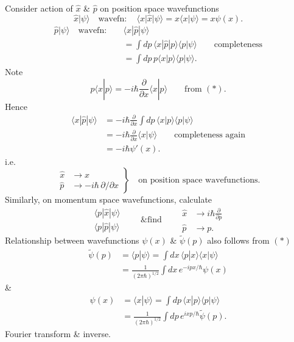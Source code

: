 \documentclass[11pt,a4paper]{article}
\begin{document}
Consider action of $\hat{x}$ \& $\hat{p}$ on position space wavefunctions
\[
    \hat{x}|\psi\rangle\quad\text{wavefn}:\quad
    \langle x|\hat{x}|\psi\rangle=x\langle x|\psi\rangle=x\psi(x).
\]
\begin{align*}
    \hat{p}|\psi\rangle\quad\text{wavefn}:\quad
    &\langle x|\hat{p}|\psi\rangle\\
    &=\int dp\,\langle x|\hat{p}|p\rangle\langle p|\psi\rangle
    \qquad\text{completeness}\\
    &=\int dp\,p\langle x|p\rangle\langle p|\psi\rangle.
\end{align*}
Note
\[
    p\langle x|p\rangle=-i\hbar\frac{\partial}{\partial x}\langle x|p\rangle
    \qquad\text{from }(*).
\]
Hence
\begin{align*}
    \langle x|\hat{p}|\psi\rangle
    &=-i\hbar\frac{\partial}{\partial x}
      \int dp\,\langle x|p\rangle\langle p|\psi\rangle\\
    &=-i\hbar\frac{\partial}{\partial x}\langle x|\psi\rangle
      \qquad\text{completeness again}\\
    &=-i\hbar\psi'(x).
\end{align*}
i.e.
\[
    \left.
    \begin{aligned}
        \hat{x}&\to x\\
        \hat{p}&\to-i\hbar\,\partial/\partial x
    \end{aligned}
    \right\}\quad\text{on position space wavefunctions}.
\]
Similarly, on momentum space wavefunctions, calculate
\[
    \begin{gathered}
        \langle p|\hat{x}|\psi\rangle\\
        \langle p|\hat{p}|\psi\rangle
    \end{gathered}
    \qquad\text{\& find}\qquad
    \begin{aligned}
        \hat{x}&\to i\hbar\frac{\partial}{\partial p}\\
        \hat{p}&\to p.
    \end{aligned}
\]
Relationship between wavefunctions $\psi(x)$ \& $\tilde{\psi}(p)$ also follows from $(*)$
\begin{align*}
    \tilde{\psi}(p)&=\langle p|\psi\rangle
    =\int dx\,\langle p|x\rangle\langle x|\psi\rangle\\
    &=\frac{1}{(2\pi\hbar)^{1/2}}\int dx\,e^{-ipx/\hbar}\psi(x)
\end{align*}
\&
\begin{align*}
    \psi(x)&=\langle x|\psi\rangle
    =\int dp\,\langle x|p\rangle\langle p|\psi\rangle\\
    &=\frac{1}{(2\pi\hbar)^{1/2}}\int dp\,e^{ixp/\hbar}\tilde{\psi}(p).
\end{align*}
Fourier transform \& inverse.
\end{document}
